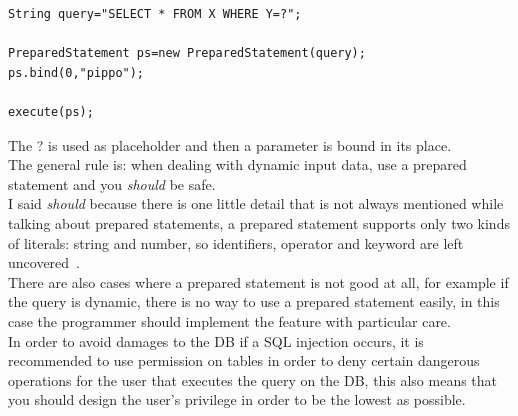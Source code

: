 \begin{lstlisting}
String query="SELECT * FROM X WHERE Y=?";

PreparedStatement ps=new PreparedStatement(query);
ps.bind(0,"pippo");

execute(ps);
\end{lstlisting}

The ? is used as placeholder and then a parameter is bound in its place.\\

The general rule is: when dealing with dynamic input data, use a prepared statement and you \emph{should} be safe.\\
I said \emph{should} because there is one little detail that is not always mentioned while talking about prepared statements,
a prepared statement supports only two kinds of literals: string and number, so identifiers, operator and keyword are left uncovered~\cite{phpinj}.\\
There are also cases where a prepared statement is not good at all, for example if the query is dynamic, there is no way to use a prepared statement
easily, in this case the programmer should implement the feature with particular care.\\

In order to avoid damages to the DB if a SQL injection occurs, it is recommended to use permission on tables in order to deny certain dangerous operations
for the user that executes the query on the DB, this also means that you should design the user's privilege in order to be the lowest as possible.\\ 


